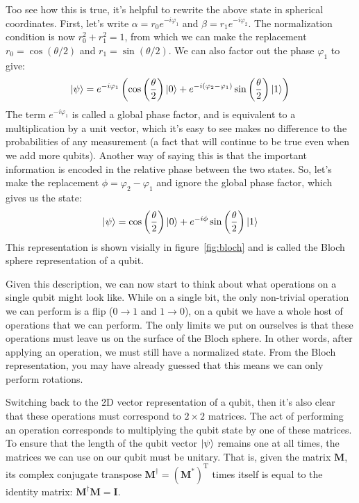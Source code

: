 Too see how this is true, it's helpful to rewrite the above state in spherical coordinates. First, let's
write $\alpha = r_0e^{-i\varphi_1}$ and $\beta = r_1e^{-i\varphi_2}$. The normalization condition is now
$r_0^2 + r_1^2 = 1$, from which we can make the replacement $r_0 = \cos(\theta/2)$ and $r_1 = \sin(\theta/2)$.
We can also factor out the phase $\varphi_1$ to give:
\begin{equation}
\ket{\psi} = e^{-i\varphi_1}\left(
    \cos\left(\frac{\theta}{2}\right)\ket{0} + e^{-i(\varphi_2 - \varphi_1)}\sin\left(\frac{\theta}{2}\right)\ket{1}
  \right)
\end{equation}
The term $e^{-i\varphi_1}$ is called a global phase factor, and is equivalent to a multiplication by a unit vector,
which it's easy to see makes no difference to the probabilities of any measurement (a fact that will continue to be
true even when we add more qubits). Another way of saying this is that the important information is encoded in
the relative phase between the two states. So, let's make the replacement $\phi = \varphi_2 - \varphi_1$ and ignore
the global phase factor, which gives us the state:
\begin{equation}
  \ket{\psi} = \cos\left(\frac{\theta}{2}\right)\ket{0} + e^{-i\phi}\sin\left(\frac{\theta}{2}\right)\ket{1}
\end{equation}
This representation is shown visially in figure~\ref{fig:bloch} and is called the Bloch sphere representation
of a qubit.

Given this description, we can now start to think about what operations on a single qubit might look like.
While on a single bit, the only non-trivial operation we can perform is a flip ($0 \rightarrow 1$ and $1 \rightarrow 0$),
on a qubit we have a whole host of operations that we can perform. The only limits we put on ourselves is that these operations
must leave us on the surface of the Bloch sphere. In other words, after applying an operation, we must still
have a normalized state. From the Bloch representation, you may have already guessed that this means we
can only perform rotations.

Switching back to the 2D vector representation of a qubit, then it's also clear that these operations
must correspond to $2\times2$ matrices. The act of performing an operation corresponds to multiplying
the qubit state by one of these matrices. To ensure that the length of the qubit vector $\ket{\psi}$
remains one at all times, the matrices we can use on our qubit must be unitary. That is, given the matrix $\boldsymbol{M}$,
its complex conjugate transpose $\boldsymbol{M}^\dagger = (\boldsymbol{M^{*}})^\mathrm{T}$ times itself is equal to
the identity matrix: $\boldsymbol{M}^\dagger\boldsymbol{M} = \boldsymbol{I}$.

